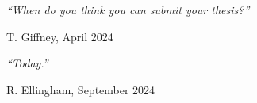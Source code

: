 \documentclass[a4paper, 11pt, oneside]{Thesis}  %
\begin{document}
	\clearpage  %
	\pagestyle{empty}  %
	\null\vfill
	\textit{``When do you think you can submit your thesis?''}
	\begin{flushright}
		T. Giffney, April 2024
	\end{flushright}
	\textit{``Today.''}
	\begin{flushright}
		R. Ellingham, September 2024
	\end{flushright}
	\vfill\vfill\vfill\vfill\vfill\vfill\null
	\clearpage  %
\end{document}
